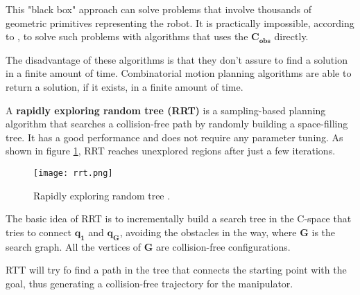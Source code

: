 This "black box" approach can solve problems that involve thousands of geometric primitives representing the robot. It is practically impossible, according to \citet{Handbook}, to solve such problems with algorithms that uses the $\bm{C_{obs}}$ directly.

The disadvantage of these algorithms is that they don't assure to find a solution in a finite amount of time. Combinatorial motion planning algorithms are able to return a solution, if it exists, in a finite amount of time.

A \textbf{rapidly exploring random tree (RRT)} is a sampling-based planning algorithm that searches a collision-free path by randomly building a space-filling tree. It has a good performance and does not require any parameter tuning. As shown in figure \ref{fig:rrt}, RRT reaches unexplored regions after just a few iterations. 
\begin{figure}[H]
	\centering
	\texttt{[image: rrt.png]}
	\vspace{-10pt}
	\caption{Rapidly exploring random tree \citep[chap. 5, page 230]{planning}.}
	\vspace{-15pt}
	\label{fig:rrt}
\end{figure}
The basic idea of RRT is to incrementally build a search tree in the C-space that tries to connect $\bm{q_{1}}$ and $\bm{q_{G}}$, avoiding the obstacles in the way, where $\bm{G}$ is the search graph. All the vertices of $\bm{G}$ are collision-free configurations. 

RTT will try fo find a path in the tree that connects the starting point with the goal, thus generating a collision-free trajectory for the manipulator.


